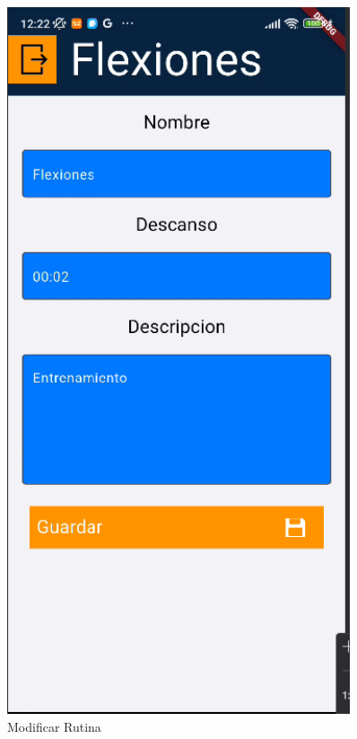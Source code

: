 \begin{figure}[H]
   \begin{minipage}{0.35\textwidth}
      \centering
      \includegraphics[width=0.9\textwidth]{pantallas/modRutina.png}
      \caption{Modificar Rutina}
      \label{fig:modRutina}
   \end{minipage}
\end{figure}


